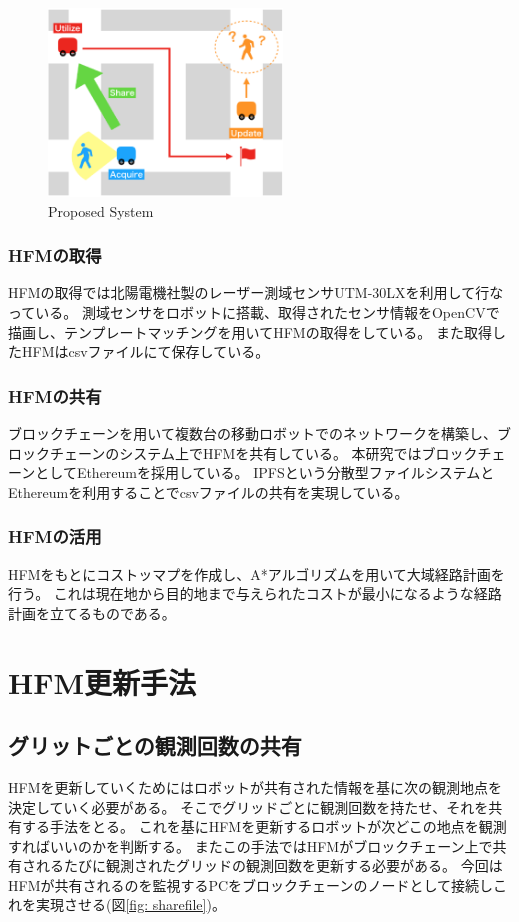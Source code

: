 \documentclass{jsarticle}
\begin{document}
\begin{figure}[tbh]
 \centering
  \includegraphics[height=50mm]{fig/proposedsystem.eps}
  \vspace*{-4mm}
  \caption{Proposed System}
  \label{fig: proposedsystem}
\end{figure}

\subsubsection{HFMの取得}
HFMの取得では北陽電機社製のレーザー測域センサUTM-30LXを利用して行なっている。
測域センサをロボットに搭載、取得されたセンサ情報をOpenCVで描画し、テンプレートマッチングを用いてHFMの取得をしている。
また取得したHFMはcsvファイルにて保存している。

\subsubsection{HFMの共有}
ブロックチェーンを用いて複数台の移動ロボットでのネットワークを構築し、ブロックチェーンのシステム上でHFMを共有している。
本研究ではブロックチェーンとしてEthereumを採用している。
IPFSという分散型ファイルシステムとEthereumを利用することでcsvファイルの共有を実現している。


\subsubsection{HFMの活用}
HFMをもとにコストッマプを作成し、A*アルゴリズムを用いて大域経路計画を行う。
これは現在地から目的地まで与えられたコストが最小になるような経路計画を立てるものである。



\section{HFM更新手法}
\subsection{グリットごとの観測回数の共有}
HFMを更新していくためにはロボットが共有された情報を基に次の観測地点を決定していく必要がある。
そこでグリッドごとに観測回数を持たせ、それを共有する手法をとる。
これを基にHFMを更新するロボットが次どこの地点を観測すればいいのかを判断する。
またこの手法ではHFMがブロックチェーン上で共有されるたびに観測されたグリッドの観測回数を更新する必要がある。
今回はHFMが共有されるのを監視するPCをブロックチェーンのノードとして接続しこれを実現させる(図\ref{fig: sharefile})。
\end{document}
